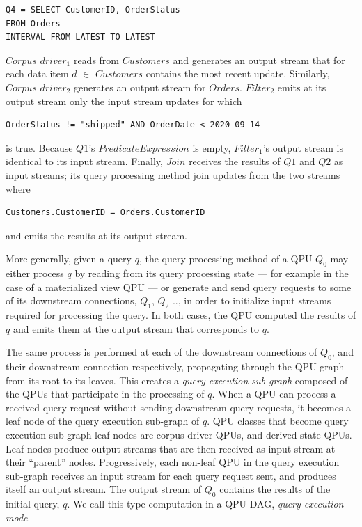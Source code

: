 \begin{lstlisting}
Q4 = SELECT CustomerID, OrderStatus
FROM Orders
INTERVAL FROM LATEST TO LATEST
\end{lstlisting}

$Corpus$ $driver_1$ reads from $Customers$ and generates an output stream that for each data item $d$ $\in$ $Customers$
contains the most recent update. Similarly, $Corpus$ $driver_2$ generates an output stream for $Orders$.
$Filter_2$ emits at its output stream only the input stream updates for which
\begin{lstlisting}
OrderStatus != "shipped" AND OrderDate < 2020-09-14
\end{lstlisting}
is true.
Because $Q1$'s $PredicateExpression$ is empty, $Filter_1$'s output stream is identical to its input stream.
Finally, $Join$ receives the results of $Q1$ and $Q2$ as input streams; its query processing method join updates from
the two streams where

\begin{lstlisting}
Customers.CustomerID = Orders.CustomerID
\end{lstlisting}
and emits the results at its output stream.

More generally, given a query $q$, the query processing method of a QPU $Q_0$ may either process $q$ by reading from its
query processing state --- for example in the case of a materialized view QPU --- or generate and send query requests to
some of its downstream connections, $Q_1$, $Q_2$ .., in order to initialize input streams required for processing the query.
In both cases, the QPU computed the results of $q$ and emits them at the output stream that corresponds to $q$.

The same process is performed at each of the downstream connections of $Q_0$, and their downstream connection respectively,
propagating through the QPU graph from its root to its leaves.
This creates a \textit{query execution sub-graph} composed of the QPUs that participate in the processing of $q$.
When a QPU can process a received query request without sending downstream query requests, it becomes a leaf node of
the query execution sub-graph of $q$.
QPU classes that become query execution sub-graph leaf nodes are corpus driver QPUs, and derived state QPUs.
Leaf nodes produce output streams that are then received as input stream at their ``parent'' nodes.
Progressively, each non-leaf QPU in the query execution sub-graph receives an input stream for each query request sent,
and produces itself an output stream.
The output stream of $Q_0$ contains the results of the initial query, $q$.
We call this type computation in a QPU DAG, \textit{query execution mode}.


